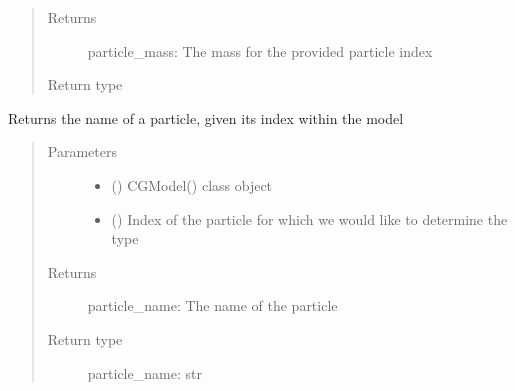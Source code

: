 \documentclass[letterpaper,12pt,english,openany,oneside]{sphinxmanual}
\begin{document}
\begin{fulllineitems}
\begin{fulllineitems}
\begin{quote}
\begin{description}
\begin{itemize}
\end{itemize}

\item[{Returns}] \leavevmode
particle\_mass: The mass for the provided particle index

\item[{Return type}] \leavevmode



\end{description}\end{quote}

\end{fulllineitems}


\begin{fulllineitems}
\label{\detokenize{cg_model:cg_model.cgmodel.CGModel.get_particle_name}}
Returns the name of a particle, given its index within the model
\begin{quote}\begin{description}
\item[{Parameters}] \leavevmode\begin{itemize}
\item {} 
 () \textendash{} CGModel() class object

\item {} 
 () \textendash{} Index of the particle for which we would like to determine the type

\end{itemize}

\item[{Returns}] \leavevmode
particle\_name: The name of the particle

\item[{Return type}] \leavevmode
particle\_name: str

\end{description}\end{quote}


\end{fulllineitems}
\end{fulllineitems}
\end{document}
